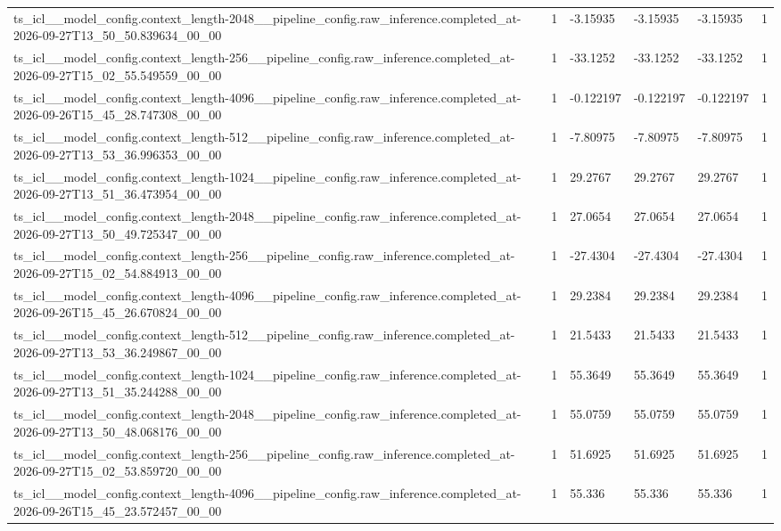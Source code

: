 \begin{tabular}{llllll}
ts\_icl\_\_model\_config.context\_length-2048\_\_pipeline\_config.raw\_inference.completed\_at-2026-09-27T13\_50\_50.839634\_00\_00 & 1 & -3.15935 & -3.15935 & -3.15935 & 1 \\
ts\_icl\_\_model\_config.context\_length-256\_\_pipeline\_config.raw\_inference.completed\_at-2026-09-27T15\_02\_55.549559\_00\_00 & 1 & -33.1252 & -33.1252 & -33.1252 & 1 \\
ts\_icl\_\_model\_config.context\_length-4096\_\_pipeline\_config.raw\_inference.completed\_at-2026-09-26T15\_45\_28.747308\_00\_00 & 1 & -0.122197 & -0.122197 & -0.122197 & 1 \\
ts\_icl\_\_model\_config.context\_length-512\_\_pipeline\_config.raw\_inference.completed\_at-2026-09-27T13\_53\_36.996353\_00\_00 & 1 & -7.80975 & -7.80975 & -7.80975 & 1 \\
ts\_icl\_\_model\_config.context\_length-1024\_\_pipeline\_config.raw\_inference.completed\_at-2026-09-27T13\_51\_36.473954\_00\_00 & 1 & 29.2767 & 29.2767 & 29.2767 & 1 \\
ts\_icl\_\_model\_config.context\_length-2048\_\_pipeline\_config.raw\_inference.completed\_at-2026-09-27T13\_50\_49.725347\_00\_00 & 1 & 27.0654 & 27.0654 & 27.0654 & 1 \\
ts\_icl\_\_model\_config.context\_length-256\_\_pipeline\_config.raw\_inference.completed\_at-2026-09-27T15\_02\_54.884913\_00\_00 & 1 & -27.4304 & -27.4304 & -27.4304 & 1 \\
ts\_icl\_\_model\_config.context\_length-4096\_\_pipeline\_config.raw\_inference.completed\_at-2026-09-26T15\_45\_26.670824\_00\_00 & 1 & 29.2384 & 29.2384 & 29.2384 & 1 \\
ts\_icl\_\_model\_config.context\_length-512\_\_pipeline\_config.raw\_inference.completed\_at-2026-09-27T13\_53\_36.249867\_00\_00 & 1 & 21.5433 & 21.5433 & 21.5433 & 1 \\
ts\_icl\_\_model\_config.context\_length-1024\_\_pipeline\_config.raw\_inference.completed\_at-2026-09-27T13\_51\_35.244288\_00\_00 & 1 & 55.3649 & 55.3649 & 55.3649 & 1 \\
ts\_icl\_\_model\_config.context\_length-2048\_\_pipeline\_config.raw\_inference.completed\_at-2026-09-27T13\_50\_48.068176\_00\_00 & 1 & 55.0759 & 55.0759 & 55.0759 & 1 \\
ts\_icl\_\_model\_config.context\_length-256\_\_pipeline\_config.raw\_inference.completed\_at-2026-09-27T15\_02\_53.859720\_00\_00 & 1 & 51.6925 & 51.6925 & 51.6925 & 1 \\
ts\_icl\_\_model\_config.context\_length-4096\_\_pipeline\_config.raw\_inference.completed\_at-2026-09-26T15\_45\_23.572457\_00\_00 & 1 & 55.336 & 55.336 & 55.336 & 1 \\

\end{tabular}
